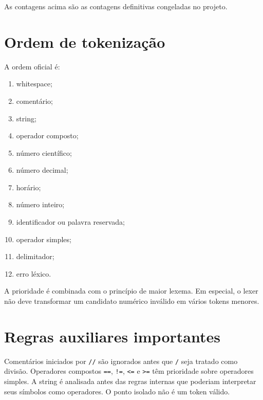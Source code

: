 As contagens acima são as contagens definitivas congeladas no projeto.

\section{Ordem de tokenização}

A ordem oficial é:

\begin{enumerate}
    \item whitespace;
    \item comentário;
    \item string;
    \item operador composto;
    \item número científico;
    \item número decimal;
    \item horário;
    \item número inteiro;
    \item identificador ou palavra reservada;
    \item operador simples;
    \item delimitador;
    \item erro léxico.
\end{enumerate}

A prioridade é combinada com o princípio de maior lexema. Em especial, o lexer não deve transformar um candidato numérico inválido em vários tokens menores.

\section{Regras auxiliares importantes}

Comentários iniciados por \texttt{//} são ignorados antes que \texttt{/} seja tratado como divisão. Operadores compostos \texttt{==}, \texttt{!=}, \texttt{<=} e \texttt{>=} têm prioridade sobre operadores simples. A string é analisada antes das regras internas que poderiam interpretar seus símbolos como operadores. O ponto isolado não é um token válido.
